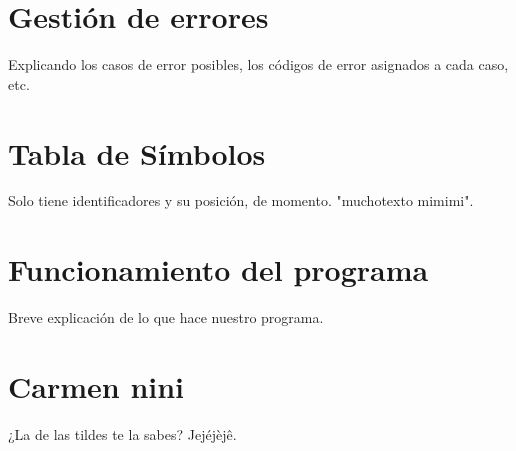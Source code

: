 \documentclass{article}
\begin{document}
\section{Gestión de errores}
Explicando los casos de error posibles, los códigos de error asignados a cada caso, etc.

\section{Tabla de Símbolos}
Solo tiene identificadores y su posición, de momento. "muchotexto mimimi".

\section{Funcionamiento del programa}
Breve explicación de lo que hace nuestro programa.

\section{Carmen nini}
¿La de las tildes te la sabes? Jejéjèjê.
\end{document}
